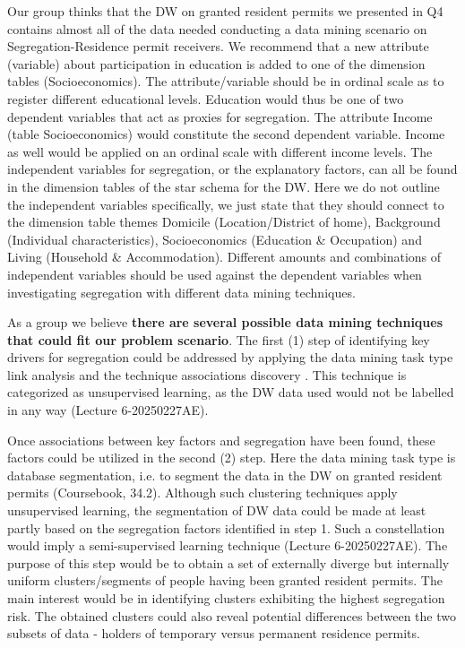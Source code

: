 Our group thinks that the DW on granted resident permits we presented in Q4 contains almost all of the data needed conducting a data mining
scenario on Segregation-Residence permit receivers. 
We recommend that a new attribute (variable) about participation in education is added to one of the dimension tables (Socioeconomics). 
The attribute/variable should be in ordinal scale as to register different educational levels. 
Education would thus be one of two dependent variables that act as proxies for segregation. 
The attribute Income (table Socioeconomics) would constitute the second dependent variable. 
Income as well would be applied on an ordinal scale with different income levels. 
The independent variables for segregation, or the explanatory factors, 
can all be found in the dimension tables of the star schema for the DW. 
Here we do not outline the independent variables specifically, 
we just state that they should connect to the dimension table themes Domicile (Location/District of home), 
Background (Individual characteristics), Socioeconomics (Education \& Occupation) and Living (Household \& Accommodation).
Different amounts and combinations of independent variables should be used against the dependent variables when 
investigating segregation with different data mining techniques.  

As a group we believe \textbf{there are several possible data mining techniques that could fit our problem scenario}. 
The first (1) step of identifying key drivers for segregation could be addressed by applying the data mining task type link analysis and 
the technique associations discovery \cite[chapter~34.2]{CourseLitt}. 
This technique is categorized as unsupervised learning,
as the DW data used would not be labelled in any way (Lecture 6-20250227AE).  

Once associations between key factors and segregation have been found, 
these factors could be utilized in the second (2) step. 
Here the data mining task type is database segmentation, 
i.e. to segment the data in the DW on granted resident permits (Coursebook, 34.2). 
Although such clustering techniques apply unsupervised learning, 
the segmentation of DW data could be made at least partly based on the segregation factors identified in step 1. 
Such a constellation would imply a semi-supervised learning technique (Lecture 6-20250227AE). 
The purpose of this step would be to obtain a set of externally diverge but 
internally uniform clusters/segments of people having been granted resident permits. 
The main interest would be in identifying clusters exhibiting the highest segregation risk. 
The obtained clusters could also reveal potential differences between the two subsets of data - 
holders of temporary versus permanent residence permits.  

